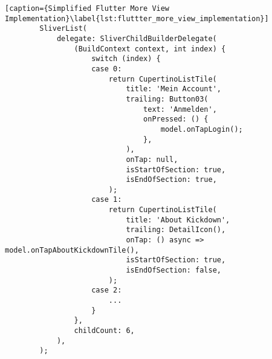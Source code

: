 \begin{minipage}{\linewidth}
    \begin{lstlisting}[caption={Simplified Flutter More View Implementation}\label{lst:fluttter_more_view_implementation}]
        SliverList(
            delegate: SliverChildBuilderDelegate(
                (BuildContext context, int index) {
                    switch (index) {
                    case 0:
                        return CupertinoListTile(
                            title: 'Mein Account',
                            trailing: Button03(
                                text: 'Anmelden',
                                onPressed: () {
                                    model.onTapLogin();
                                },
                            ),
                            onTap: null,
                            isStartOfSection: true,
                            isEndOfSection: true,
                        );
                    case 1:
                        return CupertinoListTile(
                            title: 'About Kickdown',
                            trailing: DetailIcon(),
                            onTap: () async => model.onTapAboutKickdownTile(),
                            isStartOfSection: true,
                            isEndOfSection: false,
                        );
                    case 2:
                        ...
                    }
                },
                childCount: 6,
            ),
        );
    \end{lstlisting}
\end{minipage}